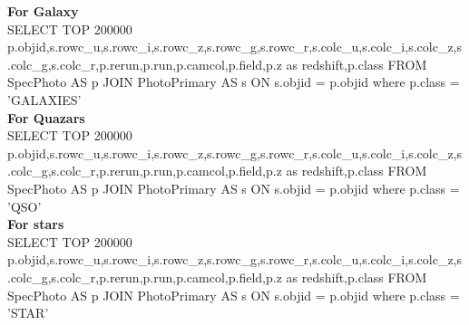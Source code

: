 
\textbf{For Galaxy}\\
SELECT TOP 200000
p.objid,s.rowc\_u,s.rowc\_i,s.rowc\_z,s.rowc\_g,s.rowc\_r,s.colc\_u,s.colc\_i,s.colc\_z,s.colc\_g,s.colc\_r,p.rerun,p.run,p.camcol,p.field,p.z as redshift,p.class
FROM SpecPhoto AS p
   JOIN PhotoPrimary AS s ON s.objid = p.objid
where p.class = 'GALAXIES'\\
\textbf{For Quazars}\\
SELECT TOP 200000
p.objid,s.rowc\_u,s.rowc\_i,s.rowc\_z,s.rowc\_g,s.rowc\_r,s.colc\_u,s.colc\_i,s.colc\_z,s.colc\_g,s.colc\_r,p.rerun,p.run,p.camcol,p.field,p.z as redshift,p.class
FROM SpecPhoto AS p
   JOIN PhotoPrimary AS s ON s.objid = p.objid
where p.class = 'QSO'\\
\textbf{For stars}\\
SELECT TOP 200000
p.objid,s.rowc\_u,s.rowc\_i,s.rowc\_z,s.rowc\_g,s.rowc\_r,s.colc\_u,s.colc\_i,s.colc\_z,s.colc\_g,s.colc\_r,p.rerun,p.run,p.camcol,p.field,p.z as redshift,p.class
FROM SpecPhoto AS p
   JOIN PhotoPrimary AS s ON s.objid = p.objid
where p.class = 'STAR'
